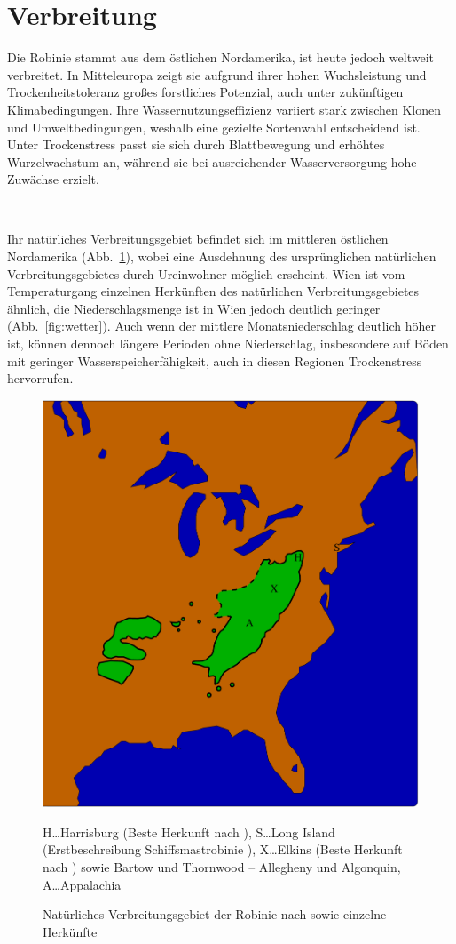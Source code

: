 \documentclass[twocolumn]{scrartcl}
\makeatletter
\newcommand{\summary}[1]{%
  \par %
  {\small\sffamily
    \noindent #1\par}
  \vspace{-0.4em}
  \noindent\makebox[\linewidth]{\rule{0.33\linewidth}{0.4pt}}\\[-1.2em]
  \@afterindentfalse\@afterheading
}
\makeatother
\begin{document}
\section{Verbreitung}

\summary{Die Robinie stammt aus dem östlichen Nordamerika, ist heute
  jedoch weltweit verbreitet. In Mitteleuropa zeigt sie aufgrund ihrer
  hohen Wuchsleistung und Trockenheitstoleranz großes forstliches
  Potenzial, auch unter zukünftigen Klimabedingungen. Ihre
  Wassernutzungseffizienz variiert stark zwischen Klonen und
  Umweltbedingungen, weshalb eine gezielte Sortenwahl entscheidend
  ist. Unter Trockenstress passt sie sich durch Blattbewegung und
  erhöhtes Wurzelwachstum an, während sie bei ausreichender
  Wasserversorgung hohe Zuwächse erzielt.}

Ihr natürliches Verbreitungsgebiet befindet sich im mittleren östlichen Nordamerika (Abb.~\ref{fig:verbreitungNatuerlich}), wobei eine Ausdehnung des ursprünglichen natürlichen Verbreitungsgebietes durch Ureinwohner möglich erscheint. Wien ist vom Temperaturgang einzelnen Herkünften des natürlichen Verbreitungsgebietes ähnlich, die Niederschlagsmenge ist in Wien jedoch deutlich geringer (Abb.~\ref{fig:wetter}). Auch wenn der mittlere Monatsniederschlag deutlich höher ist, können dennoch längere Perioden ohne Niederschlag, insbesondere auf Böden mit geringer Wasserspeicherfähigkeit, auch in diesen Regionen Trockenstress hervorrufen.

\begin{figure}[htbp]
  \centering
  \includegraphics[width=.9\linewidth]{./bild/map4}
  \caption{Natürliches Verbreitungsgebiet der Robinie nach \citet{mcalister1971robinie,little1971treeAtlas} sowie einzelne Herkünfte}
  \footnotesize{H\dots Harrisburg (Beste Herkunft nach \citet{cobbett1825woodlands}),
    S\dots Long Island (Erstbeschreibung Schiffsmastrobinie \citet{raber1936shipmast}),
    X\dots Elkins (Beste Herkunft nach \citet{hopp1941robinie}) sowie Bartow und Thornwood -- Allegheny und Algonquin,
    A\dots Appalachia}
  \label{fig:verbreitungNatuerlich}
\end{figure}
\end{document}
